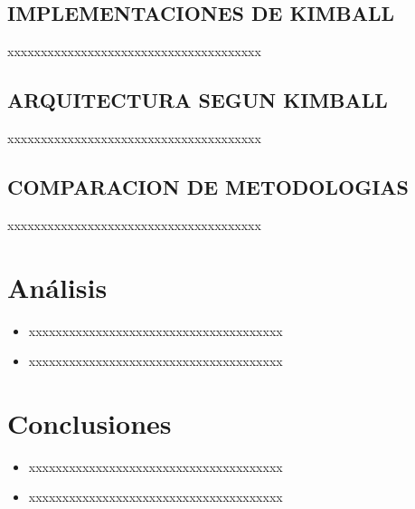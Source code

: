 \documentclass[%
 reprint,
 amsmath,amssymb,
 aps,
]{revtex4-1}
\begin{document}
\subsection{IMPLEMENTACIONES DE KIMBALL}
xxxxxxxxxxxxxxxxxxxxxxxxxxxxxxxxxxxxxx 

\subsection{ARQUITECTURA SEGUN KIMBALL}

xxxxxxxxxxxxxxxxxxxxxxxxxxxxxxxxxxxxxx 


\subsection{COMPARACION DE METODOLOGIAS}	
xxxxxxxxxxxxxxxxxxxxxxxxxxxxxxxxxxxxxx

\section{Análisis}

\begin{itemize}
\item xxxxxxxxxxxxxxxxxxxxxxxxxxxxxxxxxxxxxx 
\item xxxxxxxxxxxxxxxxxxxxxxxxxxxxxxxxxxxxxx 
\end{itemize}
\section{Conclusiones}

\begin{itemize}
\item xxxxxxxxxxxxxxxxxxxxxxxxxxxxxxxxxxxxxx 
\item xxxxxxxxxxxxxxxxxxxxxxxxxxxxxxxxxxxxxx 

\end{itemize}






\end{document}
